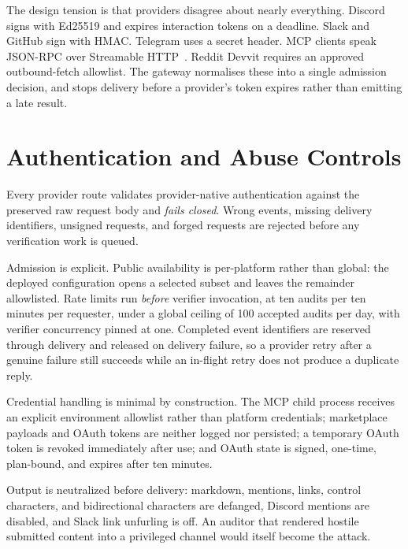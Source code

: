 The design tension is that providers disagree about nearly everything. Discord signs with
Ed25519 and expires interaction tokens on a deadline. Slack and GitHub sign with HMAC.
Telegram uses a secret header. MCP clients speak JSON-RPC over Streamable
HTTP~\cite{mcp2025spec}. Reddit Devvit requires an approved outbound-fetch allowlist. The
gateway normalises these into a single admission decision, and stops delivery before a
provider's token expires rather than emitting a late result.

\section{Authentication and Abuse Controls}
\label{sec:controls}

Every provider route validates provider-native authentication against the preserved raw
request body and \emph{fails closed}. Wrong events, missing delivery identifiers, unsigned
requests, and forged requests are rejected before any verification work is queued.

Admission is explicit. Public availability is per-platform rather than global: the deployed
configuration opens a selected subset and leaves the remainder allowlisted. Rate limits run
\emph{before} verifier invocation, at ten audits per ten minutes per requester, under a
global ceiling of 100 accepted audits per day, with verifier concurrency pinned at one.
Completed event identifiers are reserved through delivery and released on delivery failure,
so a provider retry after a genuine failure still succeeds while an in-flight retry does not
produce a duplicate reply.

Credential handling is minimal by construction. The MCP child process receives an explicit
environment allowlist rather than platform credentials; marketplace payloads and OAuth
tokens are neither logged nor persisted; a temporary OAuth token is revoked immediately
after use; and OAuth state is signed, one-time, plan-bound, and expires after ten minutes.

Output is neutralized before delivery: markdown, mentions, links, control characters, and
bidirectional characters are defanged, Discord mentions are disabled, and Slack link
unfurling is off. An auditor that rendered hostile submitted content into a privileged
channel would itself become the attack.

